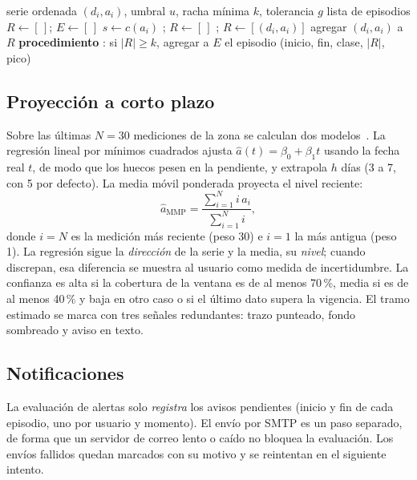 \documentclass[conference,a4paper]{IEEEtran}
\begin{document}
\begin{algorithm}[!t]
\caption{Detección de episodios sostenidos}
\label{alg:racha}
\small
\begin{algorithmic}[1]
\Require serie ordenada $(d_i,a_i)$, umbral $u$, racha mínima $k$, tolerancia $g$
\Ensure lista de episodios
\State $R\gets[\,]$; $E\gets[\,]$
  \State $s\gets c(a_i)$ 
     \State {}; $R\gets[\,]$
     \State {}; $R\gets[(d_i,a_i)]$
  \Else
     \State agregar $(d_i,a_i)$ a $R$
  \EndIf
\EndFor
\State {}
\Statex \textbf{procedimiento} : si $|R|\ge k$, agregar a $E$ el episodio (inicio, fin, clase, $|R|$, pico)
\end{algorithmic}
\end{algorithm}

\subsection{Proyección a corto plazo}
Sobre las últimas $N=30$ mediciones de la zona se calculan dos modelos~\cite{hyndman2026}. La regresión lineal por mínimos cuadrados ajusta $\hat{a}(t)=\beta_0+\beta_1 t$ usando la fecha real $t$, de modo que los huecos pesen en la pendiente, y extrapola $h$ días (3 a 7, con 5 por defecto). La media móvil ponderada proyecta el nivel reciente:
\begin{equation}
\hat{a}_{\mathrm{MMP}}=\frac{\sum_{i=1}^{N} i\,a_i}{\sum_{i=1}^{N} i},
\end{equation}
donde $i=N$ es la medición más reciente (peso 30) e $i=1$ la más antigua (peso 1). La regresión sigue la \emph{dirección} de la serie y la media, su \emph{nivel}; cuando discrepan, esa diferencia se muestra al usuario como medida de incertidumbre. La confianza es alta si la cobertura de la ventana es de al menos 70\,\%, media si es de al menos 40\,\% y baja en otro caso o si el último dato supera la vigencia. El tramo estimado se marca con tres señales redundantes: trazo punteado, fondo sombreado y aviso en texto.

\subsection{Notificaciones}
La evaluación de alertas solo \emph{registra} los avisos pendientes (inicio y fin de cada episodio, uno por usuario y momento). El envío por SMTP es un paso separado, de forma que un servidor de correo lento o caído no bloquea la evaluación. Los envíos fallidos quedan marcados con su motivo y se reintentan en el siguiente intento.
\end{document}
